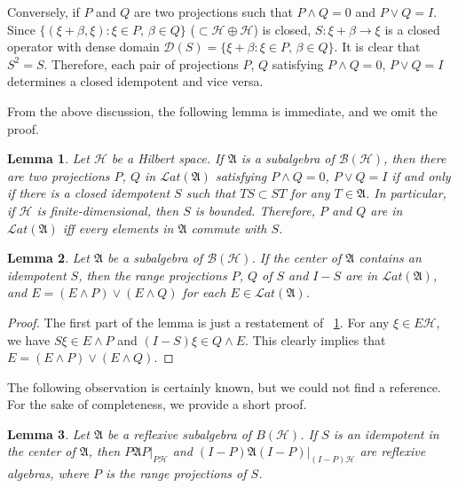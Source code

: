 \documentclass[a4paper,10pt]{amsart}
\newtheorem{lemma}{Lemma}[section]
\theoremstyle{refs}
\newcommand{\AAA}{\mathfrak A}
\newcommand{\BBB}{\mathcal B}
\newcommand{\HHH}{\mathcal H} %
\newcommand{\Lat}{\mathcal Lat}
\begin{document}
Conversely, if $P$ and $Q$ are two projections such that $P \wedge Q = 0$ and $P
\vee Q = I$. Since $\{(\xi + \beta, \xi) : \xi \in P \mbox{, } \beta \in Q \}$
($\subset \HHH \oplus \HHH$) is closed, $S: \xi + \beta \rightarrow \xi$ is a
closed operator with dense domain $\mathcal{D}(S) = \{ \xi + \beta : \xi \in P
\mbox{, } \beta \in Q \}$. It is clear that $S^2 = S$. Therefore, each pair of
projections $P$, $Q$ satisfying $P \wedge Q = 0$, $P\vee Q = I$ determines a
closed idempotent and vice versa.

From the above discussion, the following lemma is immediate, and we omit
the proof.

\begin{lemma} \label{lma3}
Let $\HHH$ be a Hilbert space.
If $\AAA$ is a subalgebra of $\BBB(\HHH)$, then there are two
projections
$P$, $Q$ in $\Lat(\AAA)$ satisfying $P \wedge Q = 0$, $P\vee Q = I$ if and
only if
there is a closed idempotent $S$ such that $TS \subset ST$ for any $T \in
\AAA$. In particular, if $\HHH$ is finite-dimensional,
then $S$ is bounded. Therefore,
$P$ and $Q$ are in $\Lat(\AAA)$ iff every elements in $\AAA$ commute
with $S$.
\end{lemma}

\begin{lemma} \label{lma4}
Let $\AAA$ be a subalgebra of $\BBB(\HHH)$. If the center of $\AAA$ contains an
idempotent $S$, then the range projections $P$, $Q$ of $S$ and $I-S$ are in
$\Lat(\AAA)$, and $E = (E \wedge P)\vee(E \wedge Q)$ for each $E \in
\Lat(\AAA)$.
\end{lemma}

\begin{proof}
The first part of the lemma is just a restatement of ~\cref{lma3}. For any $\xi
\in E\HHH$, we have $S\xi \in E \wedge P$ and $(I-S)\xi \in Q \wedge E$.
This clearly implies that $E = (E \wedge P)\vee(E \wedge Q)$.
\end{proof}

The following observation is certainly known, but we could not find
a reference. For the sake of completeness, we provide a short proof.

\begin{lemma} \label{lma5}
Let $\AAA$ be a reflexive
subalgebra of $B(\HHH)$. If $S$ is an idempotent in the center
of $\AAA$, then $P\AAA P |_{P\HHH}$ and $(I-P)\AAA (I-P)|_{(I-P)\HHH}$ are
reflexive algebras, where $P$ is the range projections of $S$.
\end{lemma}
\end{document}
